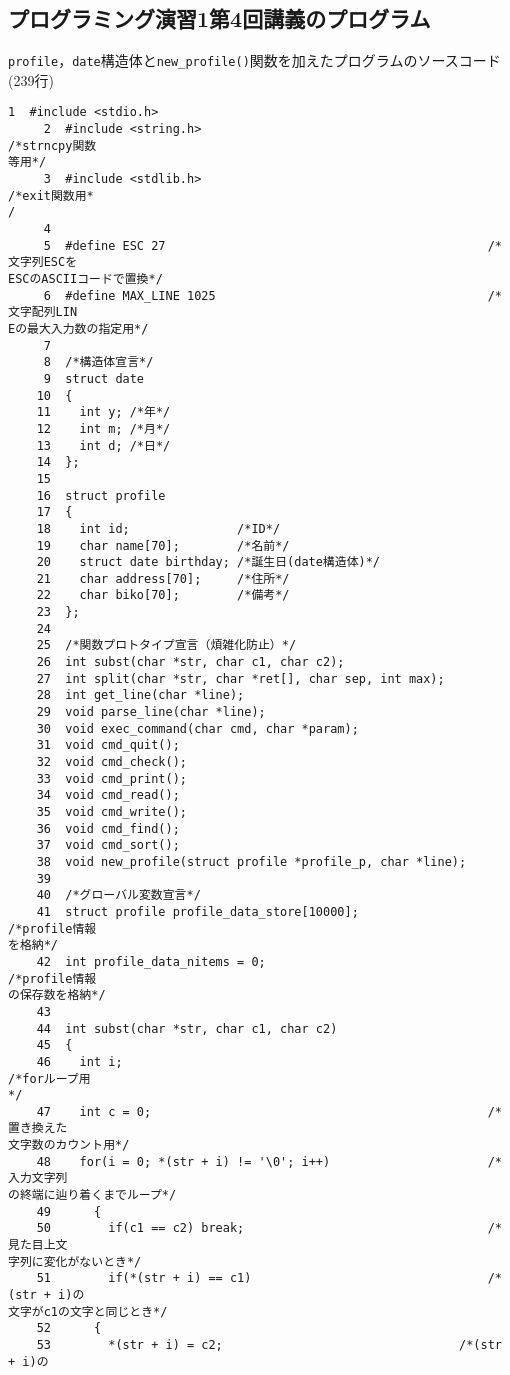 \subsection{プログラミング演習1第4回講義のプログラム}\label{func4}
\verb|profile|，\verb|date|構造体と\verb|new_profile()|関数を加えたプログラムのソースコード(239行)
\begin{Verbatim}[fontsize=\small, baselinestretch=0.8]
     1	#include <stdio.h>
     2	#include <string.h>                                        /*strncpy関数
等用*/
     3	#include <stdlib.h>                                        /*exit関数用*
/
     4	
     5	#define ESC 27                                             /*文字列ESCを
ESCのASCIIコードで置換*/
     6	#define MAX_LINE 1025                                      /*文字配列LIN
Eの最大入力数の指定用*/
     7	
     8	/*構造体宣言*/
     9	struct date
    10	{
    11	  int y; /*年*/
    12	  int m; /*月*/
    13	  int d; /*日*/
    14	};
    15	
    16	struct profile
    17	{
    18	  int id;               /*ID*/
    19	  char name[70];        /*名前*/
    20	  struct date birthday; /*誕生日(date構造体)*/
    21	  char address[70];     /*住所*/
    22	  char biko[70];        /*備考*/
    23	};
    24	
    25	/*関数プロトタイプ宣言（煩雑化防止）*/
    26	int subst(char *str, char c1, char c2);
    27	int split(char *str, char *ret[], char sep, int max);
    28	int get_line(char *line);
    29	void parse_line(char *line);
    30	void exec_command(char cmd, char *param);
    31	void cmd_quit();
    32	void cmd_check();
    33	void cmd_print();
    34	void cmd_read();
    35	void cmd_write();
    36	void cmd_find();
    37	void cmd_sort();
    38	void new_profile(struct profile *profile_p, char *line);
    39	
    40	/*グローバル変数宣言*/
    41	struct profile profile_data_store[10000];                  /*profile情報
を格納*/
    42	int profile_data_nitems = 0;                               /*profile情報
の保存数を格納*/
    43	
    44	int subst(char *str, char c1, char c2)
    45	{
    46	  int i;                                                   /*forループ用
*/
    47	  int c = 0;                                               /*置き換えた
文字数のカウント用*/
    48	  for(i = 0; *(str + i) != '\0'; i++)                      /*入力文字列
の終端に辿り着くまでループ*/
    49	    {
    50	      if(c1 == c2) break;                                  /*見た目上文
字列に変化がないとき*/
    51	      if(*(str + i) == c1)                                 /*(str + i)の
文字がc1の文字と同じとき*/
    52		{
    53		  *(str + i) = c2;                                 /*(str + i)の

\end{Verbatim}
